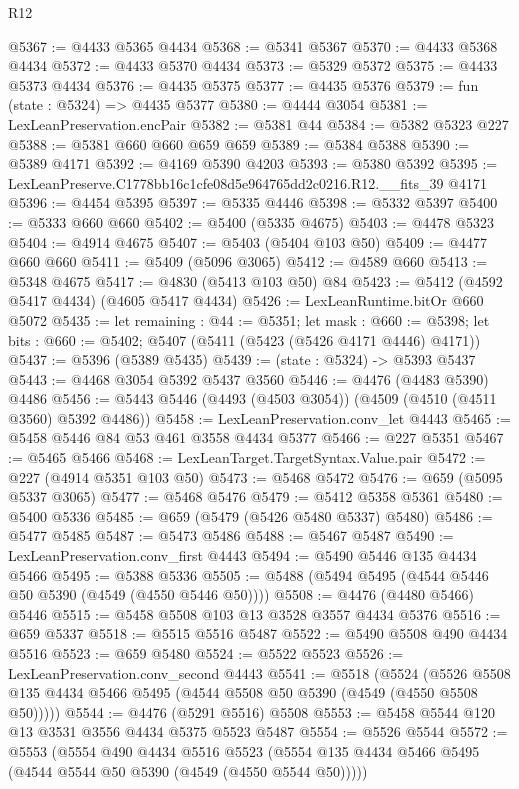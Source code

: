 \begin{lexlean}{R12}
\begin{coremodule}
@5367 := @4433 @5365 @4434
@5368 := @5341 @5367
@5370 := @4433 @5368 @4434
@5372 := @4433 @5370 @4434
@5373 := @5329 @5372
@5375 := @4433 @5373 @4434
@5376 := @4435 @5375
@5377 := @4435 @5376
@5379 := fun (state : @5324) => @4435 @5377
@5380 := @4444 @3054
@5381 := LexLeanPreservation.encPair
@5382 := @5381 @44
@5384 := @5382 @5323 @227
@5388 := @5381 @660 @660 @659 @659
@5389 := @5384 @5388
@5390 := @5389 @4171
@5392 := @4169 @5390 @4203
@5393 := @5380 @5392
@5395 := LexLeanPreserve.C1778bb16c1cfe08d5e964765dd2c0216.R12.__fits_39 @4171
@5396 := @4454 @5395
@5397 := @5335 @4446
@5398 := @5332 @5397
@5400 := @5333 @660 @660
@5402 := @5400 (@5335 @4675)
@5403 := @4478 @5323
@5404 := @4914 @4675
@5407 := @5403 (@5404 @103 @50)
@5409 := @4477 @660 @660
@5411 := @5409 (@5096 @3065)
@5412 := @4589 @660
@5413 := @5348 @4675
@5417 := @4830 (@5413 @103 @50) @84
@5423 := @5412 (@4592 @5417 @4434) (@4605 @5417 @4434)
@5426 := LexLeanRuntime.bitOr @660 @5072
@5435 := let remaining : @44 := @5351;
  let mask : @660 := @5398;
  let bits : @660 := @5402; @5407 (@5411 (@5423 (@5426 @4171 @4446) @4171))
@5437 := @5396 (@5389 @5435)
@5439 := (state : @5324) -> @5393 @5437
@5443 := @4468 @3054 @5392 @5437 @3560
@5446 := @4476 (@4483 @5390) @4486
@5456 := @5443 @5446 (@4493 (@4503 @3054)) (@4509 (@4510 (@4511 @3560) @5392 @4486))
@5458 := LexLeanPreservation.conv_let @4443
@5465 := @5458 @5446 @84 @53 @461 @3558 @4434 @5377
@5466 := @227 @5351
@5467 := @5465 @5466
@5468 := LexLeanTarget.TargetSyntax.Value.pair
@5472 := @227 (@4914 @5351 @103 @50)
@5473 := @5468 @5472
@5476 := @659 (@5095 @5337 @3065)
@5477 := @5468 @5476
@5479 := @5412 @5358 @5361
@5480 := @5400 @5336
@5485 := @659 (@5479 (@5426 @5480 @5337) @5480)
@5486 := @5477 @5485
@5487 := @5473 @5486
@5488 := @5467 @5487
@5490 := LexLeanPreservation.conv_first @4443
@5494 := @5490 @5446 @135 @4434 @5466
@5495 := @5388 @5336
@5505 := @5488 (@5494 @5495 (@4544 @5446 @50 @5390 (@4549 (@4550 @5446 @50))))
@5508 := @4476 (@4480 @5466) @5446
@5515 := @5458 @5508 @103 @13 @3528 @3557 @4434 @5376
@5516 := @659 @5337
@5518 := @5515 @5516 @5487
@5522 := @5490 @5508 @490 @4434 @5516
@5523 := @659 @5480
@5524 := @5522 @5523
@5526 := LexLeanPreservation.conv_second @4443
@5541 := @5518
    (@5524 (@5526 @5508 @135 @4434 @5466 @5495 (@4544 @5508 @50 @5390 (@4549 (@4550 @5508 @50)))))
@5544 := @4476 (@5291 @5516) @5508
@5553 := @5458 @5544 @120 @13 @3531 @3556 @4434 @5375 @5523 @5487
@5554 := @5526 @5544
@5572 := @5553
    (@5554
      @490
      @4434
      @5516
      @5523
      (@5554 @135 @4434 @5466 @5495 (@4544 @5544 @50 @5390 (@4549 (@4550 @5544 @50)))))

\end{coremodule}
\end{lexlean}
